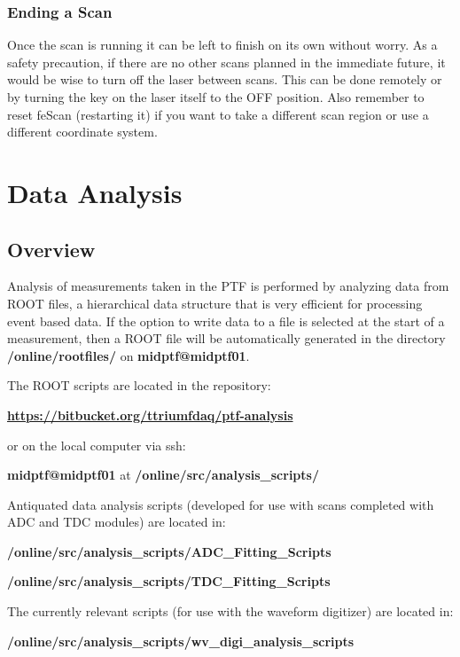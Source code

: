 \documentclass[twoside,letterpaper]{refart}
\begin{document}
\subsubsection{Ending a Scan}

Once the scan is running it can be left to finish on its own without worry.  As a safety precaution, if there are no other scans planned in the immediate future, it would be wise to turn off the laser between scans. This can be done remotely or by turning the key on the laser itself to the OFF position.  Also remember to reset feScan (restarting it) if you want to take a different scan region or use a different coordinate system. 



\clearpage
\section{Data Analysis} 

\subsection{Overview} \label{dataAnalysisFiles}

Analysis of measurements taken in the PTF is performed by analyzing data from ROOT files, a hierarchical data structure that is very efficient for processing event based data.  If the option to write data to a file is selected at the start of a measurement, then a ROOT file will be automatically generated in the directory \textbf{/online/rootfiles/} on \textbf{midptf@midptf01}.

The ROOT scripts are located in the repository:

\textbf{\url{https://bitbucket.org/ttriumfdaq/ptf-analysis}} 

or on the local computer via ssh:

\textbf{midptf@midptf01} at \textbf{/online/src/analysis\_scripts/}

Antiquated data analysis scripts (developed for use with scans completed with ADC and TDC modules) are located in:

\textbf{/online/src/analysis\_scripts/ADC\_Fitting\_Scripts}

\textbf{/online/src/analysis\_scripts/TDC\_Fitting\_Scripts}

The currently relevant scripts (for use with the waveform digitizer) are located in:

\textbf{/online/src/analysis\_scripts/wv\_digi\_analysis\_scripts}
\end{document}
